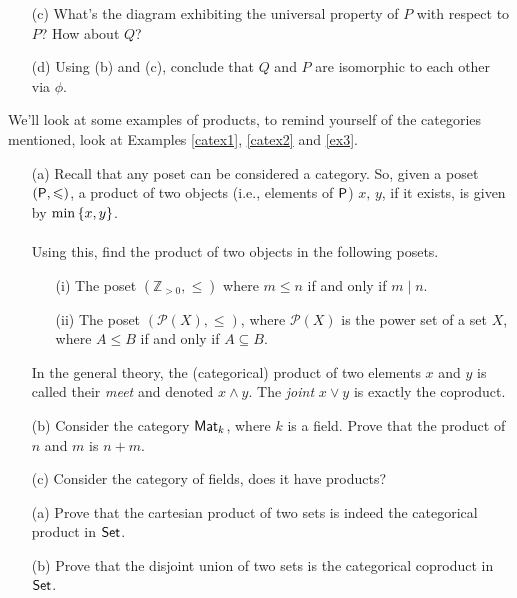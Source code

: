 \begin{problem}
\begin{itemize}
\item[(c)] What's the diagram exhibiting the universal property of $P$ with respect to $P$? How about $Q$?

\item[(d)] Using (b) and (c), conclude that $Q$ and $P$ are isomorphic to each other via $\phi$.
\end{itemize}
\end{problem}

\vspace{0.1in}

\begin{problem}\label{prob 6.2}
We'll look at some examples of products, to remind yourself of the categories mentioned, look at Examples \ref{catex1}, \ref{catex2} and \ref{ex3}.
\begin{itemize}
\item[(a)] Recall that any poset can be considered a category. So, given a poset $(\mathsf{P},\leqslant)$, a product of two objects (i.e., elements of $\mathsf{P}$) $x,\,y$, if it exists, is given by $\min\left\{x,y\right\}$.\\
\\
Using this, find the product of two objects in the following posets.
\begin{itemize}
\item[(i)] The poset $(\mathbb{Z}_{>0},\leq)$ where $m \leq n$ if and only if $m\mid n$.
\item[(ii)] The poset $(\mathscr{P}(X),\leq)$, where $\mathscr{P}(X)$ is the power set of a set $X$, where $A \leq B$ if and only if $A \subseteq B$.
\end{itemize}
In the general theory, the (categorical) product of two elements $x$ and $y$ is called their \emph{meet} and denoted $x\wedge y$. The \emph{joint} $x\vee y$ is exactly the coproduct. 
\item[(b)] Consider the category $\mathsf{Mat}_k$, where $k$ is a field. Prove that the product of $n$ and $m$ is $n + m$.
\item[(c)] Consider the category of fields, does it have products?
\end{itemize}
\end{problem}


\begin{problem}\label{prob 6.3}\hfill
\begin{itemize}
\item[(a)] Prove that the cartesian product of two sets is indeed the categorical product in $\mathsf{Set}$.
\item[(b)] Prove that the disjoint union of two sets is the categorical coproduct in $\mathsf{Set}$.
\end{itemize}
\end{problem}


